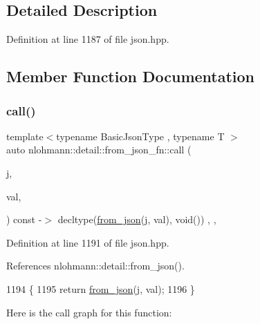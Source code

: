 \subsection{Detailed Description}


Definition at line 1187 of file json.\+hpp.



\subsection{Member Function Documentation}
\mbox{\label{structnlohmann_1_1detail_1_1from__json__fn_a2d6108c9d0f54e97134203984ed8d3a3}} 
\subsubsection{\texorpdfstring{call()}{call()}\hspace{0.1cm}{\footnotesize\ttfamily [1/2]}}
{\footnotesize\ttfamily template$<$typename Basic\+Json\+Type , typename T $>$ \\
auto nlohmann\+::detail\+::from\+\_\+json\+\_\+fn\+::call (\begin{DoxyParamCaption}\item[{const Basic\+Json\+Type \&}]{j,  }\item[{T \&}]{val,  }\item[{\hyperlink{structnlohmann_1_1detail_1_1priority__tag}{priority\+\_\+tag}$<$ 1 $>$}]{ }\end{DoxyParamCaption}) const -\/$>$ decltype(\hyperlink{namespacenlohmann_1_1detail_a58117f225f43d03e3a0a4a6f3d77c9d9}{from\+\_\+json}(j, val), void())
    \hspace{0.3cm}{\ttfamily [inline]}, {\ttfamily [private]}, {\ttfamily [noexcept]}}



Definition at line 1191 of file json.\+hpp.



References nlohmann\+::detail\+::from\+\_\+json().


\begin{DoxyCode}
1194     \{
1195         \textcolor{keywordflow}{return} \hyperlink{namespacenlohmann_1_1detail_a58117f225f43d03e3a0a4a6f3d77c9d9}{from\_json}(j, val);
1196     \}
\end{DoxyCode}
Here is the call graph for this function\+:
\mbox{\label{structnlohmann_1_1detail_1_1from__json__fn_a4949ab091885f0958ccff41dc5fa6725}} 
